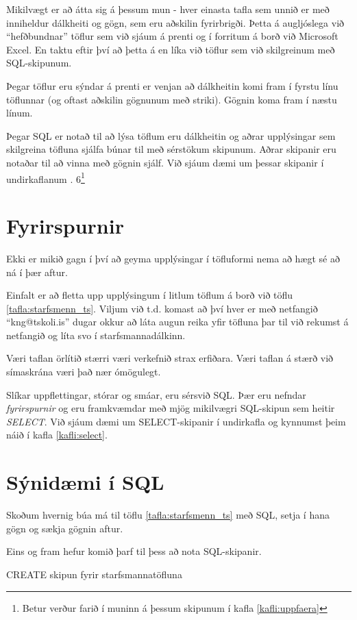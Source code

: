 Mikilvægt er að átta sig á þessum mun - hver einasta tafla sem unnið er með inniheldur dálkheiti og gögn, sem eru aðskilin fyrirbrigði. Þetta á augljóslega við ``hefðbundnar'' töflur sem við sjáum á prenti og í forritum á borð við Microsoft Excel. En taktu eftir því að þetta á en líka við töflur sem við skilgreinum með SQL-skipunum.

Þegar töflur eru sýndar á prenti er venjan að dálkheitin komi fram í fyrstu línu töflunnar (og oftast aðskilin gögnunum með striki). Gögnin koma fram í næstu línum.

Þegar SQL er notað til að lýsa töflum eru dálkheitin og aðrar upplýsingar sem skilgreina töfluna sjálfa búnar til með sérstökum skipunum. Aðrar skipanir eru notaðar til að vinna með gögnin sjálf. Við sjáum dæmi um þessar skipanir í undirkaflanum . 6\footnote{Betur verður farið í muninn á þessum skipunum í kafla \ref{kafli:uppfaera}}
\section{Fyrirspurnir}
Ekki er mikið gagn í því að geyma upplýsingar í töfluformi nema að hægt sé að ná í þær aftur.

Einfalt er að fletta upp upplýsingum í litlum töflum á borð við töflu \ref{tafla:starfsmenn_ts}. Viljum við t.d. komast að því hver er með netfangið ``kng@tskoli.is'' dugar okkur að láta augun reika yfir töfluna þar til við rekumst á netfangið og líta svo í starfsmannadálkinn.

Væri taflan örlítið stærri væri verkefnið strax erfiðara. Væri taflan á stærð við símaskrána væri það nær ómögulegt.

Slíkar uppflettingar, stórar og smáar, eru sérsvið SQL. Þær eru nefndar \emph{fyrirspurnir} og eru framkvæmdar með mjög mikilvægri SQL-skipun sem heitir \emph{SELECT}. Við sjáum dæmi um SELECT-skipanir í undirkafla  og kynnumst þeim náið í kafla \ref{kafli:select}.

\section{Sýnidæmi í SQL}
\label{undirkafli:synidaemi_i_sql}
Skoðum hvernig búa má til töflu \ref{tafla:starfsmenn_ts} með SQL, setja í hana gögn og sækja gögnin aftur. 

Eins og fram hefur komið þarf til þess að nota SQL-skipanir.

\begin{example}[h]
\caption{CREATE skipun fyrir starfsmannatöfluna}
\label{sql:k2d1}
\centering
{}
\end{example}

